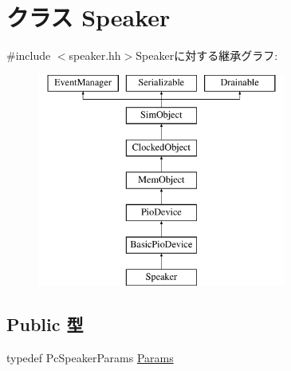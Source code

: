 \hypertarget{classX86ISA_1_1Speaker}{
\section{クラス Speaker}
\label{classX86ISA_1_1Speaker}
}


{\ttfamily \#include $<$speaker.hh$>$}Speakerに対する継承グラフ:\begin{figure}[H]
\begin{center}
\leavevmode
\includegraphics[height=7cm]{classX86ISA_1_1Speaker}
\end{center}
\end{figure}
\subsection*{Public 型}
\begin{DoxyCompactItemize}
\item 
typedef PcSpeakerParams \hyperlink{classX86ISA_1_1Speaker_ae21f9523ca3e32b9fd40e1e647ebd365}{Params}
\end{DoxyCompactItemize}
